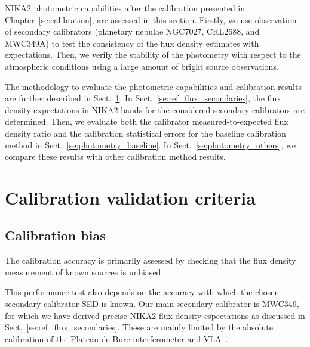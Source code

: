
NIKA2 photometric capabilities after the calibration presented in
Chapter~\ref{se:calibration}, are assessed in this section. Firstly,
we use observation of secondary calibrators (planetary nebulae NGC7027, CRL2688, and
MWC349A) to test the consistency of the flux density estimates with
expectations. Then, we verify the stability of the photometry with
respect to the atmospheric conditions using a large amount of bright
source observations.


The methodology to evaluate the photometric
capabilities and calibration results are further described in
Sect.~\ref{se:photometry_criteria}.
In Sect.~\ref{se:ref_flux_secondaries}, the flux density expectations
in NIKA2 bands for the considered secondary calibrators are
determined. Then, we evaluate both the calibrator measured-to-expected
flux density ratio and the calibration statistical errors for the
baseline calibration method in Sect.~\ref{se:photometry_baseline}. 
In Sect.~\ref{se:photometry_others}, we compare these results with other
calibration method results. 

\section{Calibration validation criteria}%
\label{se:photometry_criteria}

\subsection{Calibration bias}
The calibration accuracy is primarily assessed by checking
that the flux density measurement of known sources is unbiased.

This performance test also depends on the accuracy with which the
chosen secondary calibrator SED is known. Our main secondary
calibrator is MWC349, for which we have derived precise NIKA2 flux
density espectations as discussed in
Sect.~\ref{se:ref_flux_secondaries}.
These are mainly limited by the absolute calibration of the Plateau de
Bure interferometer and VLA~\cite{krips}.

